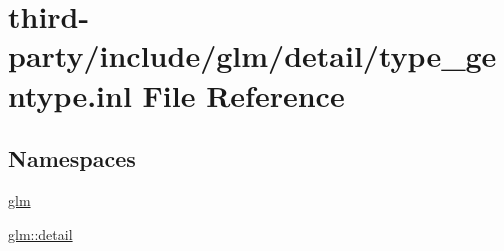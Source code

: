 \hypertarget{type__gentype_8inl}{}\section{third-\/party/include/glm/detail/type\+\_\+gentype.inl File Reference}
\label{type__gentype_8inl}
\subsection*{Namespaces}
\begin{DoxyCompactItemize}
\item 
 \hyperlink{namespaceglm}{glm}
\item 
 \hyperlink{namespaceglm_1_1detail}{glm\+::detail}
\end{DoxyCompactItemize}
